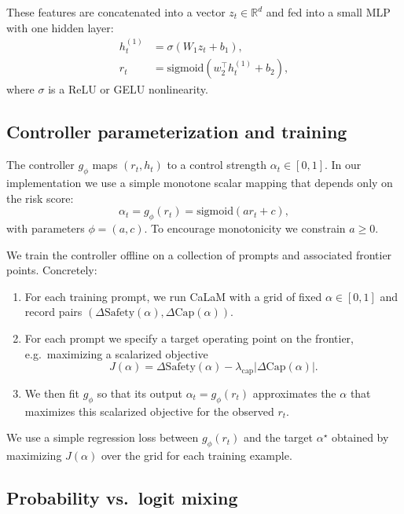 \documentclass{article}
\theoremstyle{plain}
\theoremstyle{definition}
\theoremstyle{remark}
\begin{document}
These features are concatenated into a vector $z_t \in \mathbb{R}^d$ and fed into a small MLP with one hidden layer:
\begin{align}
  h^{(1)}_t &= \sigma(W_1 z_t + b_1), \\
  r_t &= \mathrm{sigmoid}(w_2^\top h^{(1)}_t + b_2),
\end{align}
where $\sigma$ is a ReLU or GELU nonlinearity.

\subsection{Controller parameterization and training}

The controller $g_\phi$ maps $(r_t,h_t)$ to a control strength $\alpha_t \in [0,1]$.
In our implementation we use a simple monotone scalar mapping that depends only on the risk score:
\begin{equation}
  \alpha_t = g_\phi(r_t) = \mathrm{sigmoid}(a r_t + c),
\end{equation}
with parameters $\phi=(a,c)$.
To encourage monotonicity we constrain $a \ge 0$.

We train the controller offline on a collection of prompts and associated frontier points.
Concretely:

\begin{enumerate}[leftmargin=1.5em, itemsep=0pt]
  \item For each training prompt, we run CaLaM with a grid of fixed $\alpha \in [0,1]$ and record pairs $(\Delta\mathrm{Safety}(\alpha), \Delta\mathrm{Cap}(\alpha))$.
  \item For each prompt we specify a target operating point on the frontier, e.g.\ maximizing a scalarized objective
  \[
    J(\alpha) = \Delta\mathrm{Safety}(\alpha) - \lambda_{\mathrm{cap}} |\Delta\mathrm{Cap}(\alpha)|.
  \]
  \item We then fit $g_\phi$ so that its output $\alpha_t = g_\phi(r_t)$ approximates the $\alpha$ that maximizes this scalarized objective for the observed $r_t$.
\end{enumerate}

We use a simple regression loss between $g_\phi(r_t)$ and the target $\alpha^\star$ obtained by maximizing $J(\alpha)$ over the grid for each training example.

\subsection{Probability vs.\ logit mixing}
\label{app:mixing}
\end{document}
